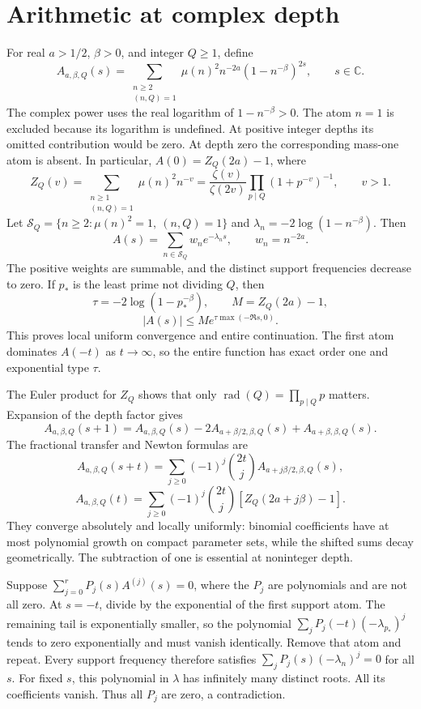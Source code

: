 \documentclass[11pt,oneside,openany]{book}
\newcommand{\A}{A_{a,\beta,Q}}
\newcommand{\Z}{Z_Q}
\begin{document}
\chapter{Arithmetic at complex depth}\label{ch:arithmetic}
For real $a>1/2$, $\beta>0$, and integer $Q\ge1$, define
\[
\boxed{\A(s)=\sum_{\substack{n\ge2\\(n,Q)=1}}
\mu(n)^2n^{-2a}(1-n^{-\beta})^{2s},\qquad s\in\mathbb C.}
\]
The complex power uses the real logarithm of $1-n^{-\beta}>0$.
The atom $n=1$ is excluded because its logarithm is undefined. At positive
integer depths its omitted contribution would be zero. At depth zero the
corresponding mass-one atom is absent. In particular, $A(0)=Z_Q(2a)-1$, where
\[
Z_Q(v)=\sum_{\substack{n\ge1\\(n,Q)=1}}\mu(n)^2n^{-v}
=\frac{\zeta(v)}{\zeta(2v)}\prod_{p\mid Q}(1+p^{-v})^{-1},\qquad v>1.
\]
Let $\mathcal S_Q=\{n\ge2:\mu(n)^2=1,\ (n,Q)=1\}$ and
$\lambda_n=-2\log(1-n^{-\beta})$. Then
\[
A(s)=\sum_{n\in\mathcal S_Q}w_ne^{-\lambda_ns},\qquad w_n=n^{-2a}.
\]
The positive weights are summable, and the distinct support frequencies decrease to zero.
If $p_*$ is the least prime not dividing $Q$, then
\[
\tau=-2\log(1-p_*^{-\beta}),\qquad M=\Z(2a)-1,
\]
\[
|A(s)|\le M e^{\tau\max(-\Re s,0)}.
\]
This proves local uniform convergence and entire continuation. The first atom
dominates $A(-t)$ as $t\to\infty$, so the entire function has exact order one
and exponential type $\tau$.

The Euler product for $Z_Q$ shows that only
$\operatorname{rad}(Q)=\prod_{p\mid Q}p$ matters. Expansion of the depth factor gives
\[
\boxed{\A(s+1)=\A(s)-2A_{a+\beta/2,\beta,Q}(s)
+A_{a+\beta,\beta,Q}(s).}
\]
The fractional transfer and Newton formulas are
\[
\A(s+t)=\sum_{j\ge0}(-1)^j\binom{2t}{j}A_{a+j\beta/2,\beta,Q}(s),
\]
\[
\A(t)=\sum_{j\ge0}(-1)^j\binom{2t}{j}[\Z(2a+j\beta)-1].
\]
They converge absolutely and locally uniformly: binomial coefficients have
at most polynomial growth on compact parameter sets, while the shifted sums
decay geometrically. The subtraction of one is essential at noninteger depth.

Suppose $\sum_{j=0}^{r}P_j(s)A^{(j)}(s)=0$, where the $P_j$ are polynomials and are not all zero.
At $s=-t$, divide by the exponential of the first support atom. The remaining
tail is exponentially smaller, so the polynomial
$\sum_jP_j(-t)(-\lambda_{p_*})^j$ tends to zero exponentially and must vanish
identically. Remove that atom and repeat. Every support frequency therefore
satisfies $\sum_jP_j(s)(-\lambda_n)^j=0$ for all $s$.
For fixed $s$, this polynomial in $\lambda$ has infinitely many distinct
roots. All its coefficients vanish. Thus all $P_j$ are zero, a contradiction.
\end{document}
